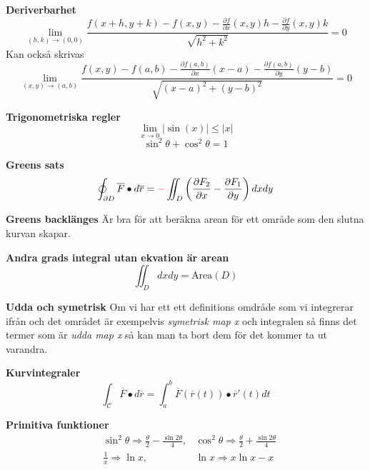 \textbf{Deriverbarhet}
\begin{equation*}
    \lim_{(h,k)\to(0,0)}\frac{f(x+h,y+k) - f(x,y) - \frac{\partial f}{\partial x}(x,y)h - \frac{\partial f}{\partial y}(x,y)k}{\sqrt{h^2+k^2}} = 0
\end{equation*}
Kan också skrivas
\begin{equation*}
    \lim_{(x,y)\to(a,b)}\frac{f(x,y) - f(a,b) - \frac{\partial f(a,b)}{\partial x}(x-a) - \frac{\partial f(a,b)}{\partial y}(y-b)}{\sqrt{(x-a)^2+(y-b)^2}} = 0
\end{equation*}


\textbf{Trigonometriska regler}
\begin{equation*}
    \lim_{x\to0} |\sin(x)| \leq |x|
\end{equation*}
\begin{equation*}
    \sin^2\theta + \cos^2\theta = 1
\end{equation*}


\textbf{Greens sats}
\begin{equation*}
    \oint_{\partial D} \overline{F}\bullet d\overline{r} = {\color{red}-} \iint_{D} \left(\frac{\partial F_2}{\partial x} - \frac{\partial F_1}{\partial y}\right)dxdy
\end{equation*}

\textbf{Greens backlänges}
Är bra för att beräkna arean för ett område som den slutna kurvan skapar.


\textbf{Andra grads integral utan ekvation är arean}
\begin{equation*}
    \iint_{D} dxdy = \text{Area}(D)
\end{equation*}


\textbf{Udda och symetrisk}
Om vi har ett ett definitions omdråde som vi integrerar ifrån och det området 
är exempelvis \textit{symetrisk map x} och integralen så finns det termer som är 
\textit{udda map x} så kan man ta bort dem för det kommer ta ut varandra.

\textbf{Kurvintegraler}
\begin{equation*}
    \int_{\mathcal{C}} \overline{F} \bullet d\overline{r} = \int^{b}_{a} \overline{F}(\overline{r}(t)) \bullet \overline{r}'(t)dt
\end{equation*}


\textbf{Primitiva funktioner}
\begin{align*}
    &\sin^2\theta \Rightarrow \frac{\theta}{2} - \frac{\sin2\theta}{4}, 
    &\cos^2\theta \Rightarrow \frac{\theta}{2} + \frac{\sin2\theta}{4} \\
    &\frac{1}{x} \Rightarrow \ln{x}, &\ln{x} \Rightarrow x\ln{x}-x
\end{align*}


